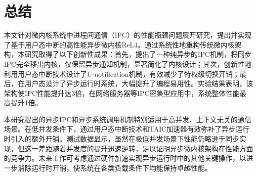 \chapter{总结}
本文针对微内核系统中进程间通信（IPC）的性能瓶颈问题展开研究，提出并实现了基于用户态中断的高性能异步微内核ReL4。通过系统性地重构传统微内核架构，本研究取得了以下创新性成果：首先，提出了一种纯异步的IPC机制，将同步IPC完全移出内核，仅保留异步通知机制，显著简化了内核设计；其次，创新性地利用用户态中断技术设计了U-notification机制，有效减少了特权级切换开销；最后，在用户态设计了异步运行时系统，大幅提升了编程易用性。实验结果表明，该架构使IPC性能提升达3倍，在网络服务器等IPC密集型应用中，系统整体性能最高提升1倍。

本研究提出的异步IPC和异步系统调用机制特别适用于高并发、上下文无关的通信场景。在低并发条件下，通过用户态中断技术和TAIC加速器有效弥补了异步运行时引入的额外开销。测试数据显示，虽然在极低并发场景下性能仍略逊于同步实现，但这一差距随着并发度的提升迅速逆转，足以证明异步微内核架构在性能方面的竞争力。未来工作可考虑通过硬件加速实现异步运行时中的其他关键操作，以进一步消除运行时开销，使系统在各类负载条件下均能保持卓越性能。